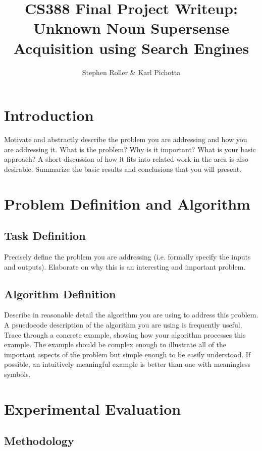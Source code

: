 \documentclass{article}
\title{CS388 Final Project Writeup:\\ 
Unknown Noun Supersense Acquisition using Search Engines}
\author{Stephen Roller \& Karl Pichotta}
\begin{document}
\maketitle




\section{Introduction}

Motivate and abstractly describe the problem you are addressing and how you are addressing it. What is the problem? Why is it important? What is your basic approach? A short discussion of how it fits into related work in the area is also desirable. Summarize the basic results and conclusions that you will present. 

\section{Problem Definition and Algorithm}

\subsection{Task Definition}

Precisely define the problem you are addressing (i.e. formally specify the inputs and outputs). Elaborate on why this is an interesting and important problem. 

\subsection{Algorithm Definition}

Describe in reasonable detail the algorithm you are using to address this problem. A psuedocode description of the algorithm you are using is frequently useful. Trace through a concrete example, showing how your algorithm processes this example. The example should be complex enough to illustrate all of the important aspects of the problem but simple enough to be easily understood. If possible, an intuitively meaningful example is better than one with meaningless symbols. 

\section{Experimental Evaluation}

\subsection{Methodology}
\end{document}
